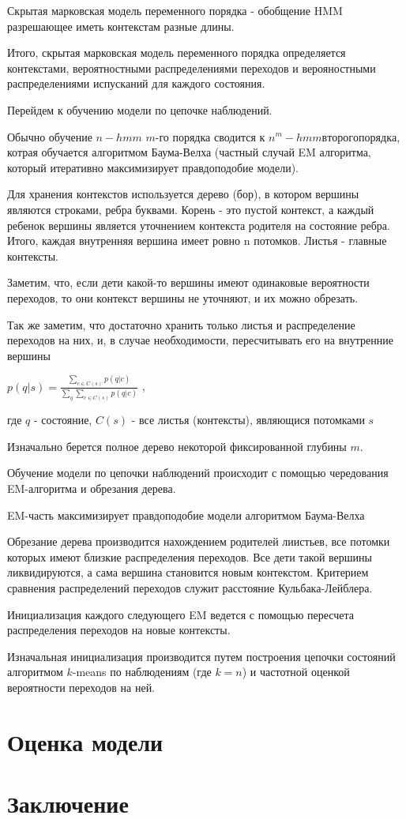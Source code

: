 \documentclass[10pt,a4paper]{article}
\begin{document}
Скрытая марковская модель переменного порядка - обобщение HMM разрешающее иметь контекстам разные длины.

Итого, скрытая марковская модель переменного порядка определяется контекстами, вероятностными распределениями переходов и верояностными распределениями испусканий для каждого состояния.

Перейдем к обучению модели по цепочке наблюдений.

Обычно обучение $ n-hmm$ $ m $-го порядка сводится к $ n^{m}-hmm второго порядка$, котрая обучается алгоритмом Баума-Велха (частный случай EM алгоритма, который итеративно максимизирует правдоподобие модели).

Для хранения контекстов используется дерево (бор), в котором вершины являются строками, ребра буквами. Корень - это пустой контекст, а каждый ребенок вершины является уточнением контекста родителя на состояние ребра.
Итого, каждая внутренняя вершина имеет ровно n потомков. Листья - главные контексты.

Заметим, что, если дети какой-то вершины имеют одинаковые вероятности переходов, то они контекст вершины не уточняют, и их можно обрезать.

Так же заметим, что достаточно хранить только листья и распределение переходов на них, и, в случае необходимости, пересчитывать его на внутренние вершины

$ p(q|s) = \frac{\sum_{c \in C(s)} {p(q|c)}}{\sum_q\sum_{c \in C(s)} {p(q|c)}} $ ,

где $ q $ - состояние, $ C(s )$ - все листья (контексты), являющися потомками $ s $

Изначально берется полное дерево некоторой фиксированной глубины $m$.

Обучение модели по цепочки наблюдений происходит с помощью чередования EM-алгоритма и обрезания дерева.

EM-часть максимизирует правдоподобие модели алгоритмом Баума-Велха

Обрезание дерева производится нахождением родителей лиистьев, все потомки которых имеют близкие распределения переходов. Все дети такой вершины ликвидируются, а сама вершина становится новым контекстом. Критерием сравнения распределений переходов служит расстояние Кульбака-Лейблера.

Инициализация каждого следующего EM ведется с помощью пересчета распределения переходов на новые контексты.

Изначальная инициализация производится путем построения цепочки состояний алгоритмом $ k $-means по наблюдениям (где $k=n$) и частотной оценкой вероятности переходов на ней.

\section{Оценка модели}

\section{Заключение}



\end{document}
